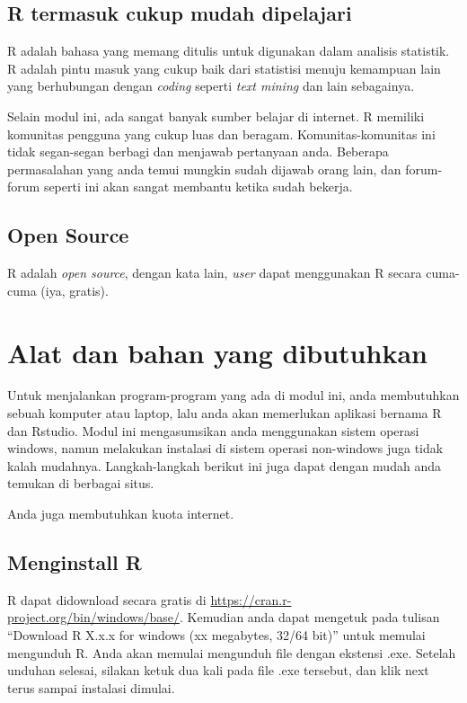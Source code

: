 \documentclass[
]{book}
\begin{document}
\hypertarget{r-termasuk-cukup-mudah-dipelajari}{%
\subsection{R termasuk cukup mudah dipelajari}\label{r-termasuk-cukup-mudah-dipelajari}}

R adalah bahasa yang memang ditulis untuk digunakan dalam analisis statistik. R adalah pintu masuk yang cukup baik dari statistisi menuju kemampuan lain yang berhubungan dengan \emph{coding} seperti \emph{text mining} dan lain sebagainya.

Selain modul ini, ada sangat banyak sumber belajar di internet. R memiliki komunitas pengguna yang cukup luas dan beragam. Komunitas-komunitas ini tidak segan-segan berbagi dan menjawab pertanyaan anda. Beberapa permasalahan yang anda temui mungkin sudah dijawab orang lain, dan forum-forum seperti ini akan sangat membantu ketika sudah bekerja.

\hypertarget{open-source}{%
\subsection{Open Source}\label{open-source}}

R adalah \emph{open source}, dengan kata lain, \emph{user} dapat menggunakan R secara cuma-cuma (iya, gratis).

\hypertarget{alat-dan-bahan-yang-dibutuhkan}{%
\section{Alat dan bahan yang dibutuhkan}\label{alat-dan-bahan-yang-dibutuhkan}}

Untuk menjalankan program-program yang ada di modul ini, anda membutuhkan sebuah komputer atau laptop, lalu anda akan memerlukan aplikasi bernama R dan Rstudio. Modul ini mengasumsikan anda menggunakan sistem operasi windows, namun melakukan instalasi di sistem operasi non-windows juga tidak kalah mudahnya. Langkah-langkah berikut ini juga dapat dengan mudah anda temukan di berbagai situs.

Anda juga membutuhkan kuota internet.

\hypertarget{menginstall-r}{%
\subsection{Menginstall R}\label{menginstall-r}}

R dapat didownload secara gratis di \url{https://cran.r-project.org/bin/windows/base/}. Kemudian anda dapat mengetuk pada tulisan ``Download R X.x.x for windows (xx megabytes, 32/64 bit)'' untuk memulai mengunduh R. Anda akan memulai mengunduh file dengan ekstensi .exe. Setelah unduhan selesai, silakan ketuk dua kali pada file .exe tersebut, dan klik next terus sampai instalasi dimulai.
\end{document}
